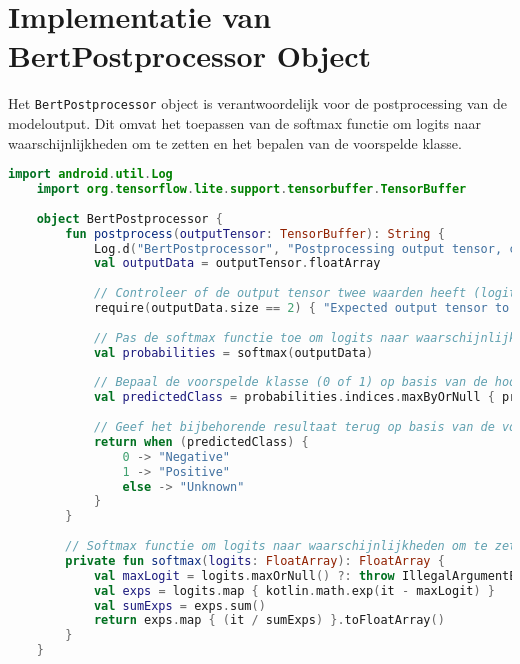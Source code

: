 \section{Implementatie van BertPostprocessor Object}

Het \texttt{BertPostprocessor} object is verantwoordelijk voor de postprocessing van de modeloutput. Dit omvat het toepassen van de softmax functie om logits naar waarschijnlijkheden om te zetten en het bepalen van de voorspelde klasse.

\begin{lstlisting}[language=Kotlin, caption={Implementatie van BertPostprocessor object}]
    import android.util.Log
    import org.tensorflow.lite.support.tensorbuffer.TensorBuffer
    
    object BertPostprocessor {
        fun postprocess(outputTensor: TensorBuffer): String {
            Log.d("BertPostprocessor", "Postprocessing output tensor, content: ${outputTensor.floatArray.contentToString()}")
            val outputData = outputTensor.floatArray
            
            // Controleer of de output tensor twee waarden heeft (logits voor binaire classificatie)
            require(outputData.size == 2) { "Expected output tensor to have exactly 2 elements, but got ${outputData.size}" }
            
            // Pas de softmax functie toe om logits naar waarschijnlijkheden om te zetten
            val probabilities = softmax(outputData)
            
            // Bepaal de voorspelde klasse (0 of 1) op basis van de hoogste waarschijnlijkheid
            val predictedClass = probabilities.indices.maxByOrNull { probabilities[it] } ?: -1
            
            // Geef het bijbehorende resultaat terug op basis van de voorspelde klasse
            return when (predictedClass) {
                0 -> "Negative"
                1 -> "Positive"
                else -> "Unknown"
            }
        }
        
        // Softmax functie om logits naar waarschijnlijkheden om te zetten
        private fun softmax(logits: FloatArray): FloatArray {
            val maxLogit = logits.maxOrNull() ?: throw IllegalArgumentException("Logits cannot be empty")
            val exps = logits.map { kotlin.math.exp(it - maxLogit) }
            val sumExps = exps.sum()
            return exps.map { (it / sumExps) }.toFloatArray()
        }
    }
\end{lstlisting}

